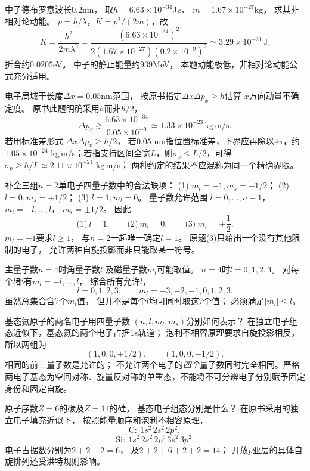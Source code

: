 \problemtext 中子德布罗意波长$0.2$nm，
取$h=6.63\times10^{-34}$J\,s、
$m=1.67\times10^{-27}$kg，
求其非相对论动能。
\workings
$p=h/\lambda$，$K=p^2/(2m)$，故
\[
\boxed{K=\frac{h^2}{2m\lambda^2}
=\frac{(6.63\times10^{-34})^2}
{2(1.67\times10^{-27})(0.2\times10^{-9})^2}
\simeq3.29\times10^{-21}\,\mathrm J}.
\]
折合约$0.0205$eV。
\crosscheck 中子的静止能量约939MeV，
本题动能极低，非相对论动能公式充分适用。

\problemtext 电子局域于长度$\Delta x=0.05$nm范围，
按原书指定$\Delta x\Delta p_x\ge h$估算
$x$方向动量不确定度。
\workings
原书此题明确采用$h$而非$\hbar/2$，
\[
\boxed{\Delta p_x\gtrsim
\frac{6.63\times10^{-34}}
{0.05\times10^{-9}}
\simeq1.33\times10^{-23}\,\mathrm{kg\,m/s}}.
\]
\crosscheck 若用标准差形式
$\Delta x\Delta p_x\ge\hbar/2$，
若$0.05$ nm指位置标准差，下界应再除以$4\pi$，约$1.05\times10^{-24}$ kg\,m/s；若指支持区间全宽$L$，则$\sigma_x\le L/2$，可得$\sigma_p\ge\hbar/L\simeq2.11\times10^{-24}$ kg\,m/s；
两种约定的结果不应混称为同一个精确界限。

\problemtext 补全三组$n=2$单电子四量子数中的合法缺项：
(1) $m_l=-1,m_s=-1/2$；
(2) $l=0,m_s=+1/2$；
(3) $l=1,m_l=0$。
\workings
量子数允许范围
$l=0,\ldots,n-1$，
$m_l=-l,\ldots,l$，
$m_s=\pm1/2$。
因此
\[
\boxed{\text{(1)}\ l=1},\qquad
\boxed{\text{(2)}\ m_l=0},\qquad
\boxed{\text{(3)}\ m_s=\pm\frac12}.
\]
\crosscheck $m_l=-1$要求$l\ge1$，
与$n=2$一起唯一确定$l=1$。
原题(3)只给出一个没有其他限制的电子，
允许两种自旋投影而非只能取某一符号。

\problemtext 主量子数$n=4$时角量子数$l$
及磁量子数$m_l$可能取值。
\workings
$n=4$时$l=0,1,2,3$。
对每个$l$都有$m_l=-l,\ldots,l$，
综合所有允许$l$，
\[
\boxed{l=0,1,2,3},\qquad
\boxed{m_l=-3,-2,-1,0,1,2,3}.
\]
\crosscheck 虽然总集合含7个$m_l$值，
但并不是每个$l$均可同时取这7个值；
必须满足$|m_l|\le l$。

\problemtext 基态氦原子的两名电子用四量子数
$(n,l,m_l,m_s)$分别如何表示？
\workings
在独立电子组态近似下，基态氦的两个电子占据$1s$轨道；
泡利不相容原理要求自旋投影相反，
所以两组为
\[
\boxed{(1,0,0,+1/2)},\qquad
\boxed{(1,0,0,-1/2)}.
\]
\crosscheck 相同的前三量子数是允许的；
不允许两个电子的\emph{四个}量子数同时完全相同。严格两电子基态为空间对称、旋量反对称的单重态，不能将不可分辨电子分别赋予固定身份和固定自旋。

\problemtext 原子序数$Z=6$的碳及$Z=14$的硅，
基态电子组态分别是什么？
\workings
在原书采用的独立电子填充近似下，
按照能量顺序和泡利不相容原理，
\[
\boxed{\mathrm C:\ 1s^2\,2s^2\,2p^2},
\]
\[
\boxed{\mathrm{Si}:\ 1s^2\,2s^2\,2p^6\,3s^2\,3p^2}.
\]
\crosscheck 电子占据数分别为$2+2+2=6$，
及$2+2+6+2+2=14$；
开放$p$亚层的具体自旋排列还受洪特规则影响。

